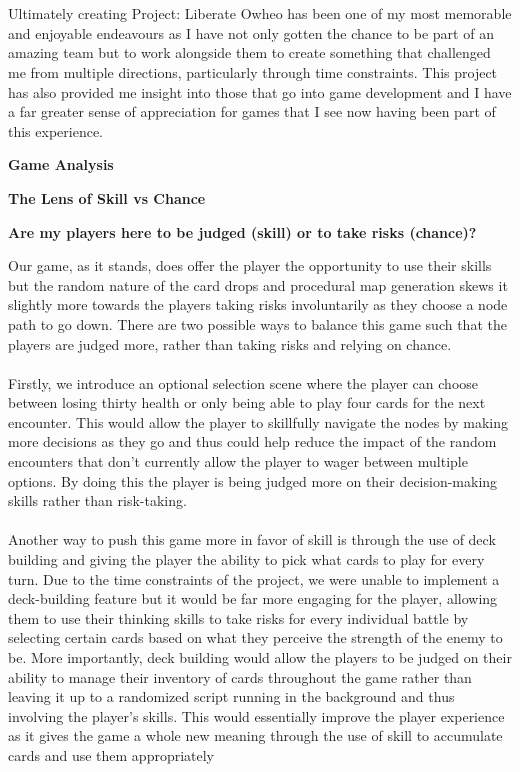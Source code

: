 \documentclass[a4paper]{article}
\begin{document}
\\\\
Ultimately creating Project: Liberate Owheo has been one of my most memorable and enjoyable endeavours as I have not only gotten the chance to be part of an amazing team but to work alongside them to create something that challenged me from multiple directions, particularly through time constraints. This project has also provided me insight into those that go into game development and I have a far greater sense of appreciation for games that I see now having been part of this experience.
\newpage
\begin{center}
{\LARGE \textbf{Game Analysis}}

\end{center}
\begin{center}
{\large \textbf{The Lens of Skill vs Chance}}
\end{center}
\vspace{0.5em}           
\begin{center}
\textbf{Are my players here to be judged (skill) or to take risks (chance)?}
\end{center}
\vspace{1.5em} 
Our game, as it stands, does offer the player the opportunity to use their skills but the random nature of the card drops and procedural map generation skews it slightly more towards the players taking risks involuntarily as they choose a node path to go down. There are two possible ways to balance this game such that the players are judged more, rather than taking risks and relying on chance.
\\\\
Firstly, we introduce an optional selection scene where the player can choose between losing thirty health or only being able to play four cards for the next encounter. This would allow the player to skillfully navigate the nodes by making more decisions as they go and thus could help reduce the impact of the random encounters that don’t currently allow the player to wager between multiple options. By doing this the player is being judged more on their decision-making skills rather than risk-taking.
\\\\
Another way to push this game more in favor of skill is through the use of deck building and giving the player the ability to pick what cards to play for every turn. Due to the time constraints of the project, we were unable to implement a deck-building feature but it would be far more engaging for the player, allowing them to use their thinking skills to take risks for every individual battle by selecting certain cards based on what they perceive the strength of the enemy to be. More importantly, deck building would allow the players to be judged on their ability to manage their inventory of cards throughout the game rather than leaving it up to a randomized script running in the background and thus involving the player's skills. This would essentially improve the player experience as it gives the game a whole new meaning through the use of skill to accumulate cards and use them appropriately 
\end{document}
